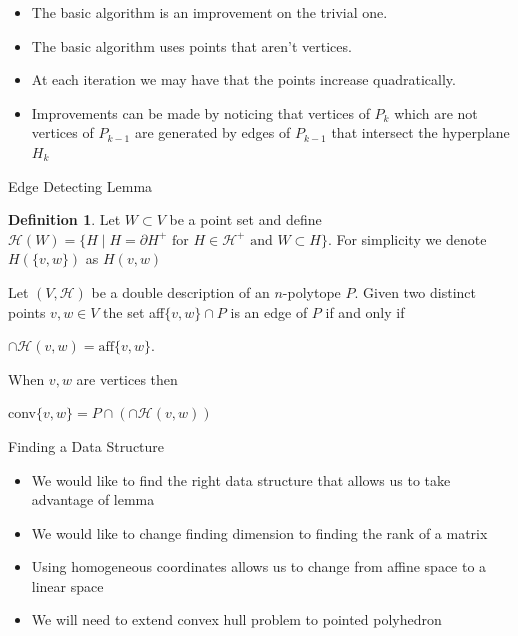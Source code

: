 \documentclass[9pt]{beamer}
\newcommand\set[1]{\{#1\}}
\theoremstyle{definition}
\newtheorem{defn}{Definition}
\begin{document}
\begin{frame}[fragile]{}
  \begin{itemize}
  \item The basic algorithm is an improvement on the trivial one.
  \item The basic algorithm uses points that aren't vertices.
  \item At each iteration we may have that the points increase quadratically.
  \item Improvements can be made by noticing that vertices of $P_k$ which are not vertices of $P_{k-1}$ are generated by edges of $P_{k-1}$ that intersect the hyperplane $H_k$
  \end{itemize}
\end{frame}


\begin{frame}[fragile]{Edge Detecting Lemma }
  \begin{defn}
    Let $W \subset V$ be a point set and define $\mathcal{H}(W) = \set{H \mid H = \partial H^+ \text{ for } H \in \mathcal{H^+} \text{ and } W \subset H}$. For simplicity we denote $H(\set{v, w})$ as $H(v, w)$
  \end{defn}
  \begin{lemma}
    Let $(V, \mathcal{H})$ be a double description of an $n$-polytope $P$. Given two distinct points $v, w \in V$ the set aff$\set{v, w} \cap P$ is an edge of $P$ if and only if
    \begin{center}
      $\cap \mathcal{H}(v, w) = \text{aff}\set{v, w}$.
    \end{center}

    
    When $v, w$ are vertices then
    \begin{center}
      conv$\set{v, w} = P \cap (\cap \mathcal{H}(v, w))$
    \end{center}
  \end{lemma}
\end{frame}


\begin{frame}[fragile]{Finding a Data Structure}
  \begin{itemize}
  \item We would like to find the right data structure that allows us to take
    advantage of lemma
  \item We would like to change finding dimension to finding the rank of a matrix
  \item Using homogeneous coordinates allows us to change from affine space to a linear space
  \item We will need to extend convex hull problem to pointed polyhedron
  \end{itemize}
\end{frame}
\end{document}
